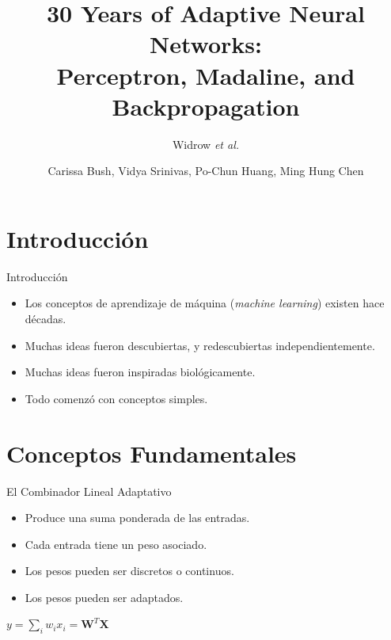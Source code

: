\documentclass[aspectratio=169,utf8,spanish]{beamer}
\title[30 Years of Adaptive Neural Networks]{
  30 Years of Adaptive Neural Networks:\\
  Perceptron, Madaline, and Backpropagation
}
\subtitle{Widrow \textit{et al.}}
\author{Carissa Bush, Vidya Srinivas, Po-Chun Huang, Ming Hung Chen}
\institute{}
\date{}
\begin{document}
\begin{frame}
  \titlepage
\end{frame}

\section{Introducción}

\begin{frame}{Introducción}
  \begin{itemize}
    \item Los conceptos de aprendizaje de máquina (\textit{machine learning}) existen hace décadas.
    \item Muchas ideas fueron descubiertas, y redescubiertas independientemente.
    \item Muchas ideas fueron inspiradas biológicamente.
    \item Todo comenzó con conceptos simples.
  \end{itemize}
\end{frame}

\section{Conceptos Fundamentales}

\begin{frame}{El Combinador Lineal Adaptativo}
  \begin{itemize}
    \item Produce una suma ponderada de las entradas.
    \item Cada entrada tiene un peso asociado.
    \item Los pesos pueden ser discretos o continuos.
    \item Los pesos pueden ser adaptados.
  \end{itemize}
  \begin{center}
    $y = \sum_{i} w_i x_i = \mathbf{W}^T \mathbf{X}$
  \end{center}
\end{frame}
\end{document}
